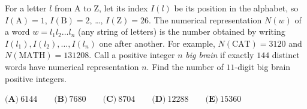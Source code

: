 For a letter $l$ from A to Z, let its index $I(l)$ be its position in the alphabet, so $I(\text{A})=1$, $I(\text{B})=2$, \dots, $I(\text{Z})=26$. The numerical representation $N(w)$ of a word $w=l_1l_2\dots l_n$ (any string of letters) is the number obtained by writing $I(l_1),I(l_2),\dots,I(l_n)$ one after another. For example, $N(\text{CAT})=3120$ and $N(\text{MATH})=131208$. Call a positive integer $n$ \emph{big brain} if exactly $144$ distinct words have numerical representation $n$. Find the number of $11$-digit big brain positive integers.

$\textbf{(A)}\ 6144 \qquad\textbf{(B)}\ 7680 \qquad\textbf{(C)}\ 8704 \qquad\textbf{(D)}\ 12288 \qquad\textbf{(E)}\ 15360$

